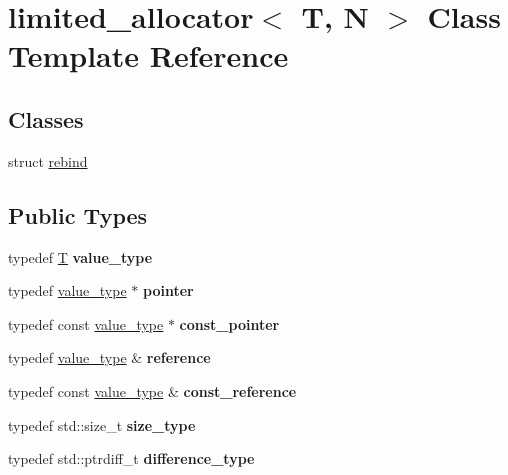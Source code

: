 \hypertarget{classlimited__allocator}{}\section{limited\+\_\+allocator$<$ T, N $>$ Class Template Reference}
\label{classlimited__allocator}
\subsection*{Classes}
\begin{DoxyCompactItemize}
\item 
struct \mbox{\hyperlink{structlimited__allocator_1_1rebind}{rebind}}
\end{DoxyCompactItemize}
\subsection*{Public Types}
\begin{DoxyCompactItemize}
\item 
\mbox{\label{classlimited__allocator_a2a6aa6fc0ee23a35ef6d9ecf4c3afa71}} 
typedef \mbox{\hyperlink{struct_t}{T}} {\bfseries value\+\_\+type}
\item 
\mbox{\label{classlimited__allocator_a3a429ab6214f5c4bd09ad72556756884}} 
typedef \mbox{\hyperlink{struct_t}{value\+\_\+type}} $\ast$ {\bfseries pointer}
\item 
\mbox{\label{classlimited__allocator_a2ec9551189b44452ce6b6f96e82541d7}} 
typedef const \mbox{\hyperlink{struct_t}{value\+\_\+type}} $\ast$ {\bfseries const\+\_\+pointer}
\item 
\mbox{\label{classlimited__allocator_abbb360ecea7978197fdca89d4207ae95}} 
typedef \mbox{\hyperlink{struct_t}{value\+\_\+type}} \& {\bfseries reference}
\item 
\mbox{\label{classlimited__allocator_adcca43fca3236d98529bb9e5dcf20ad9}} 
typedef const \mbox{\hyperlink{struct_t}{value\+\_\+type}} \& {\bfseries const\+\_\+reference}
\item 
\mbox{\label{classlimited__allocator_add892e2762d10f0d5b41216fb1669b02}} 
typedef std\+::size\+\_\+t {\bfseries size\+\_\+type}
\item 
\mbox{\label{classlimited__allocator_a9a7a6e5c4f923b8051478c269b102f14}} 
typedef std\+::ptrdiff\+\_\+t {\bfseries difference\+\_\+type}
\end{DoxyCompactItemize}
